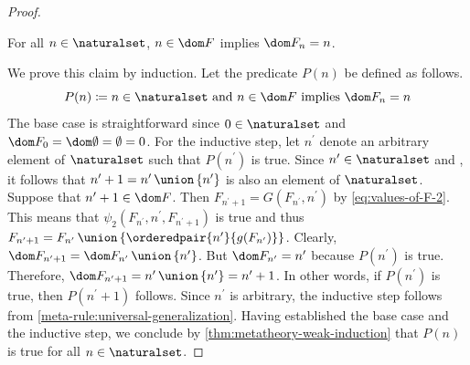 \begin{proof}
    \begin{claim}
         \label{claim:for-all-n-in-N-dom-F-n-is-n}
        For all \( n \in \naturalset \), \( n \in \dom F \) implies \( \dom F_{n} = n \).
    \end{claim}
    \noindent
    We prove this claim by induction.
    Let the predicate \( P(n) \) be defined as follows.
    \begin{equation*}
        P(n) \coloneq n \in \naturalset \ \text{and} \ n \in \dom F \ \text{implies} \ \dom F_{n} = n
    \end{equation*}
    The base case is straightforward since \( 0 \in \naturalset \) and \( \dom F_{0} = \dom \emptyset = \emptyset = 0 \).
    For the inductive step, let \( n^{\prime} \) denote an arbitrary element of \( \naturalset \) such that \( P(n^{\prime}) \) is true.
    Since \( n^{\prime} \in \naturalset \) and ,
    it follows that \( n^{\prime} + 1 = n^{\prime} \,{\union}\, \mleft\{ n^{\prime} \mright\} \) is also an element of \( \naturalset \).
    Suppose that \( n^{\prime} + 1 \in \dom F \).
    Then \( F_{n^{\prime} + 1} = G(F_{n^{\prime}}, n^{\prime}) \) by \eqref{eq:values-of-F-2}.
    This means that \( \psi_{2}(F_{n^{\prime}}, n^{\prime}, F_{n^{\prime} + 1}) \) is true and thus
    \( F_{n^{\prime} + 1} = F_{n^{\prime}} \,{\union}\, \mleft\{ \orderedpair{n^{\prime}}{g(F_{n^{\prime}})} \mright\} \).
    Clearly, \( \dom F_{n^{\prime} + 1} = \dom F_{n^{\prime}} \,{\union}\, \mleft\{ n^{\prime} \mright\} \).
    But \( \dom F_{n^{\prime}} = n^{\prime} \) because \( P(n^{\prime}) \) is true.
    Therefore, \( \dom F_{n^{\prime} + 1} = n^{\prime} \,{\union}\, \mleft\{ n^{\prime} \mright\} = n^{\prime} + 1 \).
    In other words, if \( P(n^{\prime}) \) is true, then \( P(n^{\prime} + 1) \) follows.
    Since \( n^{\prime} \) is arbitrary, the inductive step follows from \cref{meta-rule:universal-generalization}.
    Having established the base case and the inductive step, we conclude by \cref{thm:metatheory-weak-induction} that
    \( P(n) \) is true for all \( n \in \naturalset \).


\end{proof}
